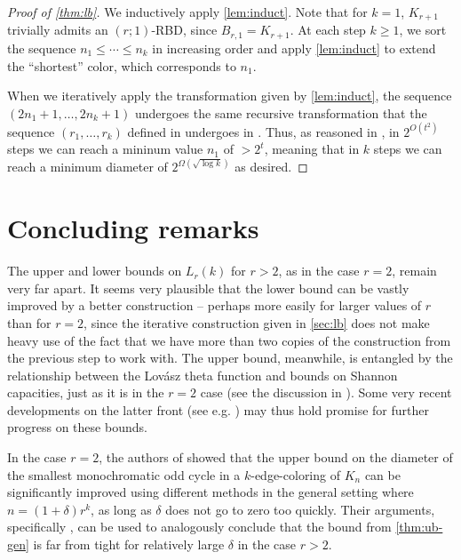 \documentclass[reqno]{amsart}
\theoremstyle{remark}
\theoremstyle{definition}
\numberwithin{theorem}{section}
\renewcommand{\le}{\leqslant}
\renewcommand{\ge}{\geqslant}
\begin{document}
\begin{proof}[Proof of \cref{thm:lb}]
We inductively apply \cref{lem:induct}. Note that for $k=1$, $K_{r+1}$ trivially admits an $(r;1)$-RBD, since $B_{r,1}=K_{r+1}$. At each step $k\ge 1$, we sort the sequence $n_1\le \cdots\le n_k$ in increasing order and apply \cref{lem:induct} to extend the ``shortest'' color, which corresponds to $n_1$. 

When we iteratively apply the transformation given by \cref{lem:induct}, the sequence $(2n_1+1,\dots,2n_k+1)$ undergoes the same recursive transformation that the sequence $(r_1,\dots,r_k)$ defined in \cite{DayJohnson2017MulticolourRamseyOddCycles} undergoes in \cite[Lemma~5]{DayJohnson2017MulticolourRamseyOddCycles}. Thus, as reasoned in \cite[Corollary~6]{DayJohnson2017MulticolourRamseyOddCycles}, in $2^{O(t^2)}$ steps we can reach a mininum value $n_1$ of $>2^t$, meaning that in $k$ steps we can reach a minimum diameter of $2^{\Omega(\sqrt{\log k})}$ as desired.

\end{proof}

\section{Concluding remarks}
\label{sec:conclusion}
The upper and lower bounds on $L_r(k)$ for $r>2$, as in the case $r=2$, remain very far apart. It seems very plausible that the lower bound can be vastly improved by a better construction -- perhaps more easily for larger values of $r$ than for $r=2$, since the iterative construction given in \cref{sec:lb} does not make heavy use of the fact that we have more than two copies of the construction from the previous step to work with. The upper bound, meanwhile, is entangled by the relationship between the Lov\'asz theta function and bounds on Shannon capacities, just as it is in the $r=2$ case (see the discussion in \cite[Section~3]{JanzerYip2026ShortMonochromaticOddCycles}). Some very recent developments on the latter front (see e.g. \cite{itty2026improved}) may thus hold promise for further progress on these bounds.

In the case $r=2$, the authors of \cite{ACJMR2026} showed that the upper bound on the diameter of the smallest monochromatic odd cycle in a $k$-edge-coloring of $K_n$ can be significantly improved using different methods in the general setting where $n=(1+\delta)r^k$, as long as $\delta$ does not go to zero too quickly. Their arguments, specifically \cite[Lemma~2.1]{ACJMR2026}, can be used to analogously conclude that the bound from \cref{thm:ub-gen} is far from tight for relatively large $\delta$ in the case $r>2$.
\end{document}
